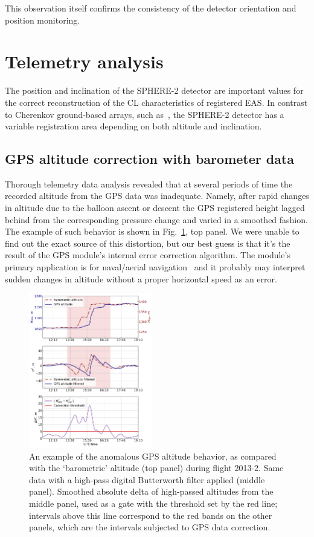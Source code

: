 \documentclass[preprint,5p,times]{elsarticle}
\begin{document}
This observation itself confirms the consistency of the detector orientation and position monitoring.

\section{Telemetry analysis}

The position and inclination of the SPHERE-2 detector are important values for the correct reconstruction of the CL characteristics of registered EAS. In contrast to Cherenkov ground-based arrays, such as~\cite{Yakutsk19,TUNKA133}, the SPHERE-2 detector has a variable registration area depending on both altitude and inclination.

\subsection{GPS altitude correction with barometer data}
\label{sect:gps_correction}

Thorough telemetry data analysis revealed that at several periods of time the recorded altitude from the GPS data was inadequate. Namely, after rapid changes in altitude due to the balloon ascent or descent the GPS registered height lagged behind from the corresponding pressure change and varied in a smoothed fashion. The example of such behavior is shown in Fig.~\ref{fig:h_corr}, top panel. We were unable to find out the exact source of this distortion, but our best guess is that it's the result of the GPS module's internal error correction algorithm. The module's primary application is for naval/aerial navigation~\cite{GPS-module-specs} and it probably may interpret sudden changes in altitude without a proper horizontal speed as an error.

\begin{figure}[tb]
    \includegraphics[width=0.48\textwidth]{height_correction.pdf} 
    \caption{An example of the anomalous GPS altitude behavior, as compared with the `barometric' altitude (top panel) during flight 2013-2. Same data with a high-pass digital Butterworth filter applied (middle panel). Smoothed absolute delta of high-passed altitudes from the middle panel, used as a gate with the threshold set by the red line; intervals above this line correspond to the red bands on the other panels, which are the intervals subjected to GPS data correction.}
\label{fig:h_corr}
\end{figure}
\end{document}
